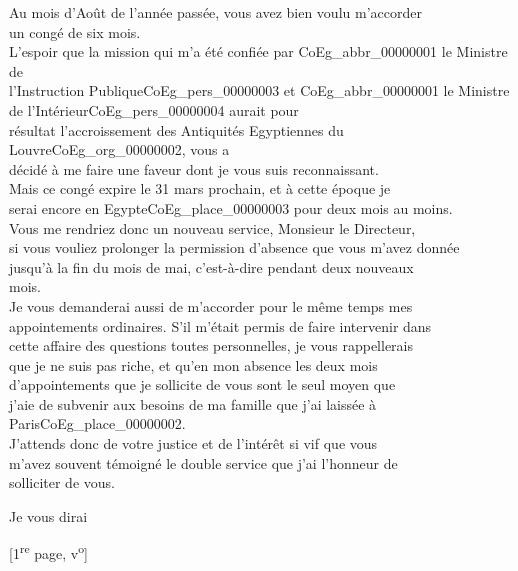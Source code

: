 \documentclass{book}
\begin{document}
\par Au mois d’Août de l’année passée, vous avez bien voulu m’accorder\\
un congé de six mois.\\
\indent L’espoir que la mission qui m’a été confiée par \gls{CoEg_abbr_00000001} le Ministre de
\\l’Instruction Publique\gls{CoEg_pers_00000003} et \gls{CoEg_abbr_00000001} le Ministre de l’Intérieur\gls{CoEg_pers_00000004} aurait pour\\
résultat l’accroissement des Antiquités Egyptiennes du Louvre\gls{CoEg_org_00000002}, vous a\\
décidé à me faire une faveur dont je vous suis reconnaissant.\\
\indent Mais ce congé expire le 31 mars prochain, et à cette époque je\\
serai encore en Egypte\gls{CoEg_place_00000003} pour deux mois au moins.\\
\indent Vous me rendriez donc un nouveau service, Monsieur le Directeur,\\
si vous vouliez prolonger la permission d’absence que vous m’avez donnée\\
jusqu’à la fin du mois de mai, c’est-à-dire pendant deux nouveaux\\
mois.\\
\indent Je vous demanderai aussi de m’accorder pour le même temps mes\\
appointements ordinaires. S’il m’était permis de faire intervenir dans\\
cette affaire des questions toutes personnelles, je vous rappellerais\\
que je ne suis pas riche, et qu’en mon absence les deux mois\\
d’appointements que je sollicite de vous sont le seul moyen que\\
j’aie de subvenir aux besoins de ma famille que j’ai laissée à Paris\gls{CoEg_place_00000002}.\\
\indent J’attends donc de votre justice et de l’intérêt si vif que vous\\
m’avez souvent témoigné le double service que j’ai l’honneur de\\
solliciter de vous.
\begin{flushright}Je vous dirai\end{flushright}
{\footnotesize \begin{center} {[1\textsuperscript{re} page, v\textsuperscript{o}]}\end{center}}
\end{document}
